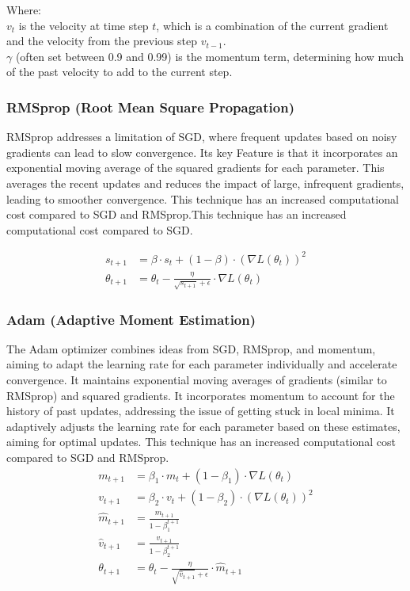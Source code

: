 \documentclass{article}
\begin{document}
\noindent\hspace*{10mm}
\begin{minipage}{\dimexpr\linewidth-20mm}
    Where:\\
    $v_{t}$ is the velocity at time step ${t}$, which is a combination of the current gradient and the velocity from the previous step $v_{t-1}$.\\
    ${\gamma}$ (often set between 0.9 and 0.99) is the momentum term, determining how much of the past velocity to add to the current step.
\end{minipage}

\subsubsection{RMSprop (Root Mean Square Propagation)}
RMSprop addresses a limitation of SGD, where frequent updates based on noisy gradients can lead to slow convergence.
Its key Feature is that it incorporates an exponential moving average of the squared gradients for each parameter. This averages the recent updates and reduces the impact of large, infrequent gradients, leading to smoother convergence. This technique has an increased computational cost compared to SGD and RMSprop.This technique has an increased computational cost compared to SGD.

\begin{align*}
    s_{t+1}      & = \beta \cdot s_t + (1 - \beta) \cdot (\nabla L(\theta_t))^2                 \\
    \theta_{t+1} & = \theta_t - \frac{\eta}{\sqrt{s_{t+1}} + \epsilon} \cdot \nabla L(\theta_t)
\end{align*}

\subsubsection{Adam (Adaptive Moment Estimation)}
The Adam optimizer combines ideas from SGD, RMSprop, and momentum, aiming to adapt the learning rate for each parameter individually and accelerate convergence.
It maintains exponential moving averages of gradients (similar to RMSprop) and squared gradients.
It incorporates momentum to account for the history of past updates, addressing the issue of getting stuck in local minima.
It adaptively adjusts the learning rate for each parameter based on these estimates, aiming for optimal updates. This technique has an increased computational cost compared to SGD and RMSprop.
\begin{align*}
    m_{t+1}       & = \beta_1 \cdot m_t + (1 - \beta_1) \cdot \nabla L(\theta_t)                  \\
    v_{t+1}       & = \beta_2 \cdot v_t + (1 - \beta_2) \cdot (\nabla L(\theta_t))^2              \\
    \hat{m}_{t+1} & = \frac{m_{t+1}}{1 - \beta_1^{t+1}}                                           \\
    \hat{v}_{t+1} & = \frac{v_{t+1}}{1 - \beta_2^{t+1}}                                           \\
    \theta_{t+1}  & = \theta_t - \frac{\eta}{\sqrt{\hat{v}_{t+1}} + \epsilon} \cdot \hat{m}_{t+1}
\end{align*}
\end{document}
